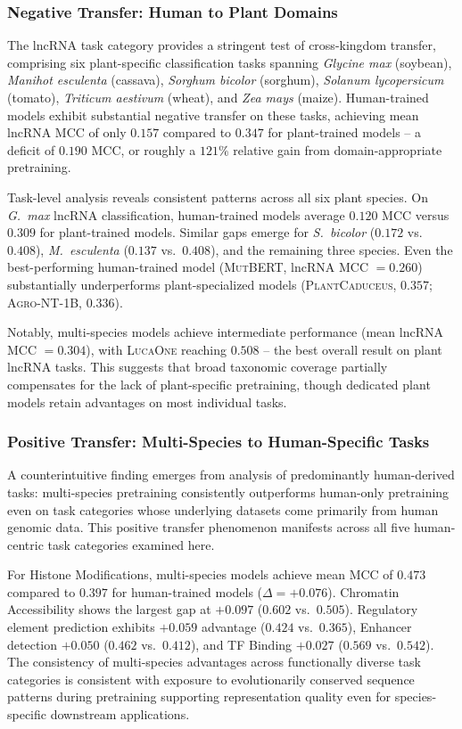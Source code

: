 \documentclass{article}
\theoremstyle{plain}
\theoremstyle{definition}
\theoremstyle{remark}
\begin{document}
\subsubsection{Negative Transfer: Human to Plant Domains}

The lncRNA task category provides a stringent test of cross-kingdom
transfer, comprising six plant-specific classification tasks
spanning \textit{Glycine max} (soybean),
\textit{Manihot esculenta} (cassava), \textit{Sorghum bicolor}
(sorghum), \textit{Solanum lycopersicum} (tomato),
\textit{Triticum aestivum} (wheat), and \textit{Zea mays} (maize).
Human-trained models exhibit substantial negative transfer on
these tasks, achieving mean lncRNA MCC of only $0.157$ compared
to $0.347$ for plant-trained models -- a deficit of $0.190$ MCC,
or roughly a $121\%$ relative gain from domain-appropriate
pretraining.

Task-level analysis reveals consistent patterns across all six
plant species. On \textit{G.\ max} lncRNA classification,
human-trained models average $0.120$ MCC versus $0.309$ for
plant-trained models. Similar gaps emerge for
\textit{S.\ bicolor} ($0.172$ vs.\ $0.408$),
\textit{M.\ esculenta} ($0.137$ vs.\ $0.408$), and the remaining
three species. Even the best-performing human-trained model
(\textsc{MutBERT}, lncRNA MCC $= 0.260$) substantially
underperforms plant-specialized models (\textsc{PlantCaduceus},
$0.357$; \textsc{Agro-NT-1B}, $0.336$).

Notably, multi-species models achieve intermediate performance
(mean lncRNA MCC $= 0.304$), with \textsc{LucaOne} reaching
$0.508$ -- the best overall result on plant lncRNA tasks. This
suggests that broad taxonomic coverage partially compensates for
the lack of plant-specific pretraining, though dedicated plant
models retain advantages on most individual tasks.

\subsubsection{Positive Transfer: Multi-Species to Human-Specific Tasks}

A counterintuitive finding emerges from analysis of predominantly
human-derived tasks: multi-species pretraining consistently
outperforms human-only pretraining even on task categories whose
underlying datasets come primarily from human genomic data. This
positive transfer phenomenon manifests across all five
human-centric task categories examined here.

For Histone Modifications, multi-species models achieve mean MCC
of $0.473$ compared to $0.397$ for human-trained models
($\Delta = +0.076$). Chromatin Accessibility shows the largest
gap at $+0.097$ ($0.602$ vs.\ $0.505$). Regulatory element
prediction exhibits $+0.059$ advantage ($0.424$ vs.\ $0.365$),
Enhancer detection $+0.050$ ($0.462$ vs.\ $0.412$), and TF
Binding $+0.027$ ($0.569$ vs.\ $0.542$). The consistency of
multi-species advantages across functionally diverse task
categories is consistent with exposure to evolutionarily conserved
sequence patterns during pretraining supporting representation
quality even for species-specific downstream applications.
\end{document}
